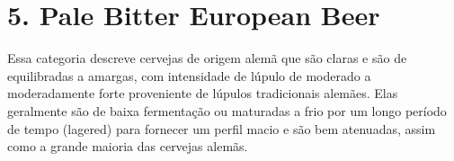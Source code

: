 \section*{5. Pale Bitter European Beer}

Essa categoria descreve cervejas de origem alemã que são claras e são de equilibradas a amargas, com  intensidade de lúpulo de moderado a moderadamente forte proveniente de lúpulos tradicionais alemães. Elas geralmente são de baixa fermentação ou maturadas a frio por um longo período de tempo (lagered) para fornecer um perfil macio e são bem atenuadas, assim como a grande maioria das cervejas alemãs.
